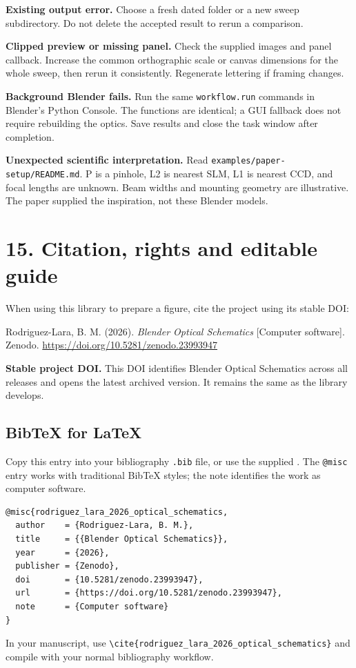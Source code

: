 \documentclass[11pt,a4paper]{article}
\begin{document}
\textbf{Existing output error.} Choose a fresh dated folder or a new sweep subdirectory. Do not delete the accepted result to rerun a comparison.

\textbf{Clipped preview or missing panel.} Check the supplied images and panel callback. Increase the common orthographic scale or canvas dimensions for the whole sweep, then rerun it consistently. Regenerate lettering if framing changes.

\textbf{Background Blender fails.} Run the same \texttt{workflow.run} commands in Blender's Python Console. The functions are identical; a GUI fallback does not require rebuilding the optics. Save results and close the task window after completion.

\textbf{Unexpected scientific interpretation.} Read \texttt{examples/paper-setup/README.md}. P is a pinhole, L2 is nearest SLM, L1 is nearest CCD, and focal lengths are unknown. Beam widths and mounting geometry are illustrative. The paper supplied the inspiration, not these Blender models.

\clearpage
\section*{15. Citation, rights and editable guide}
When using this library to prepare a figure, cite the project using its stable DOI:

Rodriguez-Lara, B. M. (2026). \textit{Blender Optical Schematics} [Computer software]. Zenodo.\newline
\url{https://doi.org/10.5281/zenodo.23993947}

\textbf{Stable project DOI.} This DOI identifies Blender Optical Schematics across all releases and opens the latest archived version. It remains the same as the library develops.

\subsection*{BibTeX for LaTeX}
Copy this entry into your bibliography \texttt{.bib} file, or use the supplied . The \texttt{@misc} entry works with traditional BibTeX styles; the note identifies the work as computer software.
\begin{Verbatim}[fontsize=\small]
@misc{rodriguez_lara_2026_optical_schematics,
  author    = {Rodriguez-Lara, B. M.},
  title     = {{Blender Optical Schematics}},
  year      = {2026},
  publisher = {Zenodo},
  doi       = {10.5281/zenodo.23993947},
  url       = {https://doi.org/10.5281/zenodo.23993947},
  note      = {Computer software}
}
\end{Verbatim}
In your manuscript, use \verb|\cite{rodriguez_lara_2026_optical_schematics}| and compile with your normal bibliography workflow.
\end{document}
